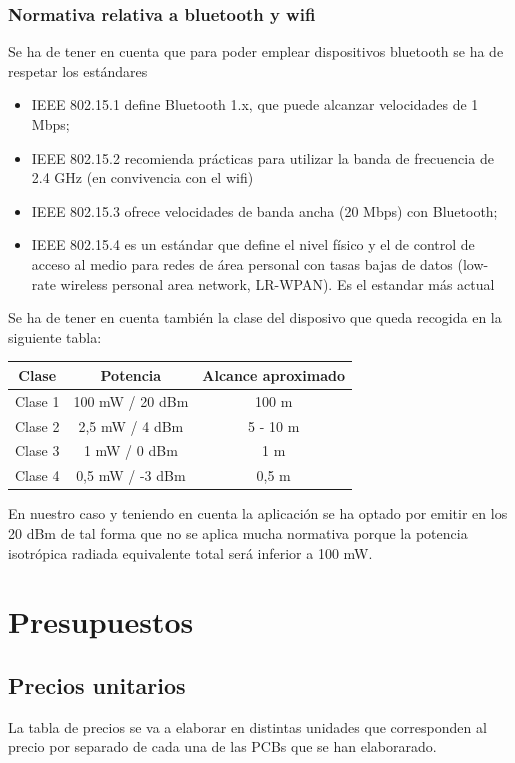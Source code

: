\documentclass[a4paper ,12pt, onecolumn]{article}
\begin{document}
    \subsubsection{Normativa relativa a bluetooth y wifi}
        Se ha de tener en cuenta que para poder emplear dispositivos bluetooth se ha de respetar los estándares
        \begin{itemize}
            \item IEEE 802.15.1 define Bluetooth 1.x, que puede alcanzar velocidades de 1 Mbps;
            \item IEEE 802.15.2 recomienda prácticas para utilizar la banda de frecuencia de 2.4 GHz (en convivencia con el wifi)
            \item IEEE 802.15.3 ofrece velocidades de banda ancha (20 Mbps) con Bluetooth;
            \item IEEE 802.15.4 es un estándar que define el nivel físico y el de control de acceso al medio 
            para redes de área personal con tasas bajas de datos (low-rate wireless personal area network, LR-WPAN).
            Es el estandar más actual
        \end{itemize}
        Se ha de tener en cuenta también la clase del disposivo que queda recogida en la siguiente tabla:
        \begin{center}
            \begin{tabular}{||c | c |c ||} 
            \hline
            Clase & Potencia  & Alcance aproximado\\ [0.5ex] 
            \hline\hline
            Clase 1 & 100 mW / 20 dBm & 100 m \\ 
            Clase 2 & 2,5 mW / 4 dBm & 5 - 10 m \\ 
            Clase 3 & 1 mW / 0 dBm & 1 m \\ 
            Clase 4 & 0,5 mW / -3 dBm & 0,5 m \\ 
            \hline
            \end{tabular}
        \end{center}
        En nuestro caso y teniendo en cuenta la aplicación se ha optado por emitir en los 20 dBm de tal forma
        que no se aplica mucha normativa porque la potencia isotrópica radiada equivalente total será
        inferior a 100 mW.
\section{Presupuestos}
    \subsection{Precios unitarios}
        La tabla de precios se va a elaborar en distintas unidades que corresponden al precio por separado de cada
        una de las PCBs que se han elaborarado.
\end{document}
